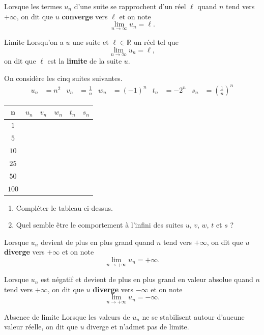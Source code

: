 \documentclass[11pt]{article}
\begin{document}
\begin{notation}
  Lorsque les termes $u_n$ d'une suite se rapprochent d'un réel $\ell$ quand $n$
  tend vers $+\infty$, on dit que $u$ \textbf{converge} vers $\ell$ et on note
  \[
    \lim_{n\to\infty}u_n=\ell.
  \]
\end{notation}
\begin{defi}{Limite}
  Lorsqu'on a $u$ une suite et $\ell\in\mathbb{R}$ un réel tel que
  \[
    \lim_{n\to\infty}u_n=\ell,
  \]
  on dit que $\ell$ est la \textbf{limite} de la suite $u$.
\end{defi}

\begin{app}
  On considère les cinq suites suivantes.
  \begin{align*}
    u_n &= n^2 &
    v_n &= \frac{1}{n} &
    w_n &= (-1)^n &
    t_n &= -2^n &
    s_n &= \left( \frac{1}{n} \right)^n
  \end{align*}
 \begin{center}
  \renewcommand{\arraystretch}{2}
  \begin{tabularx}{\textwidth}{|c|Y|Y|Y|Y|Y|}
   \hline
   $\mathbf{n}$ & $u_n$ & $v_n$ & $w_n$ & $t_n$ & $s_n$ \\
   \hline
   $1$ & & & & & \\
   \hline
   $5$ & & & & & \\
   \hline
   $10$ & & & & & \\
   \hline
   $25$ & & & & & \\
   \hline
   $50$ & & & & & \\
   \hline
   $100$ & & & & & \\
   \hline
  \end{tabularx}
  \end{center}
  \begin{enumerate}
    \item Compléter le tableau ci-dessus.
    \item Quel semble être le comportement à l'infini des suites $u$, $v$, $w$,
      $t$ et $s$ ?
  \end{enumerate}
\end{app}
\begin{notation}
  Lorsque $u_n$ devient de plus en plus grand quand $n$ tend vers $+\infty$, on
  dit que $u$ \textbf{diverge} vers $+\infty$ et on note
  \[
    \lim_{n\to+\infty}u_n=+\infty.
  \]
\end{notation}
\begin{notation}
  Lorsque $u_n$ est négatif et devient de plus en plus grand en valeur absolue
  quand $n$ tend vers $+\infty$, on
  dit que $u$ \textbf{diverge} vers $-\infty$ et on note
  \[
    \lim_{n\to+\infty}u_n=-\infty.
  \]
\end{notation}

\begin{defi}{Absence de limite}
  Lorsque les valeurs de $u_n$ ne se stabilisent autour d'aucune valeur réelle,
  on dit que $u$ diverge et n'admet pas de limite.
\end{defi}
\end{document}
